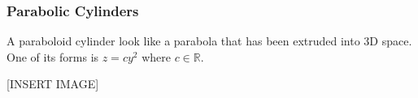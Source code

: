\subsubsection{Parabolic Cylinders}
\noindent
A paraboloid cylinder look like a parabola that has been extruded into 3D space. One of its forms is $z=cy^2$ where $c\in\mathbb{R}$.

[INSERT IMAGE]